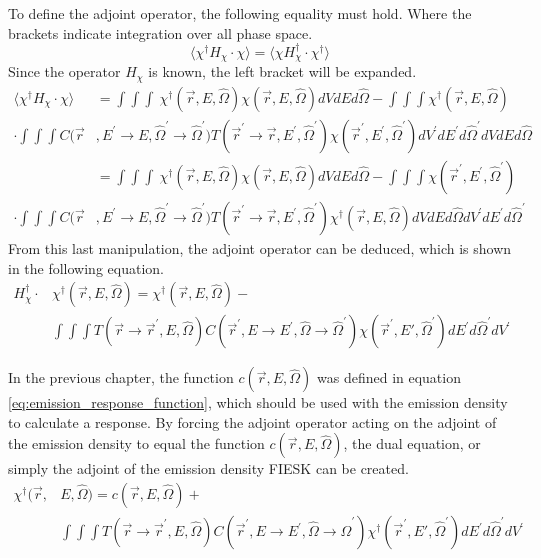 To define the adjoint operator, the following equality must hold. Where the 
brackets indicate integration over all phase space.
\begin{equation*}
  \langle \chi^{\dagger}H_{\chi} \cdot \chi \rangle = 
  \langle \chi H_{\chi}^{\dagger} \cdot \chi^{\dagger} \rangle
\end{equation*}
Since the operator $H_{\chi}$ is known, the left bracket will be expanded.
\begin{align}
  \langle \chi^{\dagger}H_{\chi} \cdot \chi \rangle & =
  \int\int\int \
  \chi^{\dagger}(\vec{r},E,\hat{\Omega}) \chi(\vec{r},E,\hat{\Omega})
  dV dE d\hat{\Omega} - \int\int\int \chi^{\dagger}(\vec{r},E,\hat{\Omega}) 
  \nonumber \\
  \cdot \int\int\int 
  C(\vec{r}&,E^{'} \to E, \hat{\Omega}^{'} \to \hat{\Omega}^{'})
  T(\vec{r}^{'} \to \vec{r},E^{'},\hat{\Omega}^{'})
  \chi(\vec{r}^{'},E^{'},\hat{\Omega}^{'}) dV^{'}dE^{'}d\hat{\Omega}^{'}
  dV dE d\hat{\Omega} \nonumber \\
  & = \int\int\int \
  \chi^{\dagger}(\vec{r},E,\hat{\Omega}) \chi(\vec{r},E,\hat{\Omega})
  dV dE d\hat{\Omega} - \int\int\int \chi(\vec{r}^{'},E^{'},\hat{\Omega}^{'}) 
  \nonumber \\
  \cdot \int\int\int 
  C(\vec{r}&,E^{'} \to E, \hat{\Omega}^{'} \to \hat{\Omega}^{'})
  T(\vec{r}^{'} \to \vec{r},E^{'},\hat{\Omega}^{'})
  \chi^{\dagger}(\vec{r},E,\hat{\Omega}) dV dE d\hat{\Omega}
  dV^{'}dE^{'}d\hat{\Omega}^{'}
\end{align}
From this last manipulation, the adjoint operator can be deduced, which is 
shown in the following equation.
\begin{equation}
  \begin{split}
    H_{\chi}^{\dagger} \cdot &\chi^{\dagger}(\vec{r},E,\hat{\Omega}) = 
    \chi^{\dagger}(\vec{r},E,\hat{\Omega}) - \\
    & \int\int\int T(\vec{r} \to \vec{r}^{'},E,\hat{\Omega}) 
    C(\vec{r}^{'},E \to E^{'},\hat{\Omega} \to \hat{\Omega}^{'})
    \chi(\vec{r}^{'},E',\hat{\Omega}^{'}) dE^{'}d\hat{\Omega}^{'}dV^{'}
  \end{split}
\end{equation}

In the previous chapter, the function $c(\vec{r},E,\hat{\Omega})$ was defined 
in equation \ref{eq:emission_response_function}, which should be used with 
the emission density to calculate a response. By forcing the adjoint 
operator acting on the adjoint of the emission density to equal the 
function $c(\vec{r},E,\hat{\Omega})$, the dual equation, or simply the adjoint
of the emission density FIESK can be created.
\begin{equation}
  \begin{split}
    \chi^{\dagger}(\vec{r},&E,\hat{\Omega}) = c(\vec{r},E,\hat{\Omega}) + \\
    &\int\int\int T(\vec{r} \to \vec{r}^{'},E,\hat{\Omega}) 
    C(\vec{r}^{'},E \to E^{'},\hat{\Omega} \to \hat{\Omega}^{'})
    \chi^{\dagger}(\vec{r}^{'},E',\hat{\Omega}^{'}) dE^{'}d\hat{\Omega}^{'}dV^{'}
  \end{split}
  \label{eq:adjoint_of_emission_density_integral_eqn}
\end{equation}

